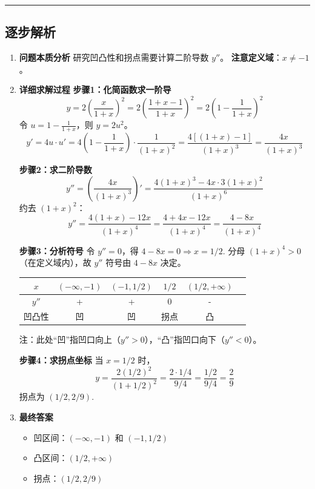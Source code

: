\documentclass[12pt, a4paper]{article}
\newenvironment{redenv}{\color{red}}{}
\newenvironment{detailedanalysis}{%
    \color{red}
    \begin{enumerate}[label=\textbf{第\arabic*步：}, leftmargin=*, align=left, itemsep=1.5ex]
}{%
    \end{enumerate}
}
\newcommand{\analysisrule}{\noindent\rule{\textwidth}{0.8pt}\vspace{-0.8em}}
\begin{document}
\begin{redenv}
\analysisrule
\subsection*{逐步解析}

\begin{detailedanalysis}
\item \textbf{问题本质分析}
研究凹凸性和拐点需要计算二阶导数 $y''$。
\textbf{注意定义域}：$x \neq -1$。

\item \textbf{详细求解过程}
\textbf{步骤1：化简函数求一阶导}
\[ y = 2 \left( \frac{x}{1+x} \right)^2 = 2 \left( \frac{1+x-1}{1+x} \right)^2 = 2 \left( 1 - \frac{1}{1+x} \right)^2 \]
令 $u = 1 - \frac{1}{1+x}$，则 $y = 2u^2$。
\[ y' = 4u \cdot u' = 4 \left( 1 - \frac{1}{1+x} \right) \cdot \frac{1}{(1+x)^2} = \frac{4[(1+x)-1]}{(1+x)^3} = \frac{4x}{(1+x)^3} \]

\textbf{步骤2：求二阶导数}
\[ y'' = \left( \frac{4x}{(1+x)^3} \right)' = \frac{4(1+x)^3 - 4x \cdot 3(1+x)^2}{(1+x)^6} \]
约去 $(1+x)^2$：
\[ y'' = \frac{4(1+x) - 12x}{(1+x)^4} = \frac{4 + 4x - 12x}{(1+x)^4} = \frac{4 - 8x}{(1+x)^4} \]

\textbf{步骤3：分析符号}
令 $y'' = 0$，得 $4 - 8x = 0 \Rightarrow x = 1/2$.
分母 $(1+x)^4 > 0$（在定义域内），故 $y''$ 符号由 $4-8x$ 决定。
\begin{center}
\begin{tabular}{|c|c|c|c|c|c|}
\hline
$x$ & $(-\infty, -1)$ & $(-1, 1/2)$ & $1/2$ & $(1/2, +\infty)$ \\
\hline
$y''$ & + & + & 0 & - \\
\hline
凹凸性 & 凹 & 凹 & 拐点 & 凸 \\
\hline
\end{tabular}
\end{center}
注：此处“凹”指凹口向上（$y''>0$），“凸”指凹口向下（$y''<0$）。

\textbf{步骤4：求拐点坐标}
当 $x = 1/2$ 时，
\[ y = \frac{2(1/2)^2}{(1 + 1/2)^2} = \frac{2 \cdot 1/4}{9/4} = \frac{1/2}{9/4} = \frac{2}{9} \]
拐点为 $(1/2, 2/9)$.

\item \textbf{最终答案}
\begin{itemize}
    \item 凹区间：$(-\infty, -1)$ 和 $(-1, 1/2)$
    \item 凸区间：$(1/2, +\infty)$
    \item 拐点：$(1/2, 2/9)$
\end{itemize}
\end{detailedanalysis}
\end{redenv}
\end{document}
